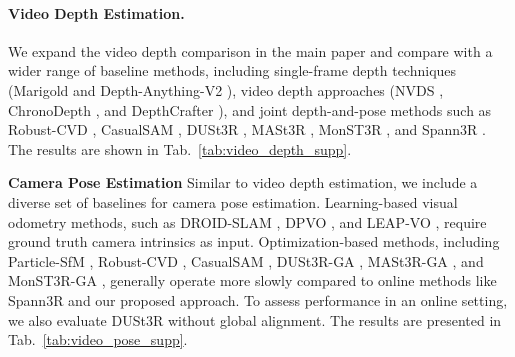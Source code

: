 \paragraph{Video Depth Estimation.}
We expand the video depth comparison in the main paper and compare with a wider range of baseline methods, including single-frame depth techniques (Marigold \cite{marigold} and Depth-Anything-V2 \cite{depth_anything_v2}), video depth approaches (NVDS \cite{NVDS}, ChronoDepth \cite{shao2024learning}, and DepthCrafter \cite{hu2024-DepthCrafter}), and joint depth-and-pose methods such as Robust-CVD \cite{robustcvd}, CasualSAM \cite{casualsam}, DUSt3R \cite{wang2024dust3r}, MASt3R \cite{leroy2024mast3r}, MonST3R \cite{zhang2024monst3r}, and Spann3R \cite{spann3r}. The results are shown in Tab.~\ref{tab:video_depth_supp}.

\vspace{0.5em}
\noindent\textbf{Camera Pose Estimation}
Similar to video depth estimation, we include a diverse set of baselines for camera pose estimation. Learning-based visual odometry methods, such as DROID-SLAM \cite{teed2021droid}, DPVO \cite{teed2023deep}, and LEAP-VO \cite{chen2024leap}, require ground truth camera intrinsics as input. Optimization-based methods, including Particle-SfM \cite{zhao2022particlesfm}, Robust-CVD \cite{robustcvd}, CasualSAM \cite{casualsam}, DUSt3R-GA \cite{wang2024dust3r}, MASt3R-GA \cite{leroy2024mast3r}, and MonST3R-GA \cite{zhang2024monst3r}, generally operate more slowly compared to online methods like Spann3R \cite{spann3r} and our proposed approach. To assess performance in an online setting, we also evaluate DUSt3R without global alignment. The results are presented in Tab.~\ref{tab:video_pose_supp}.





